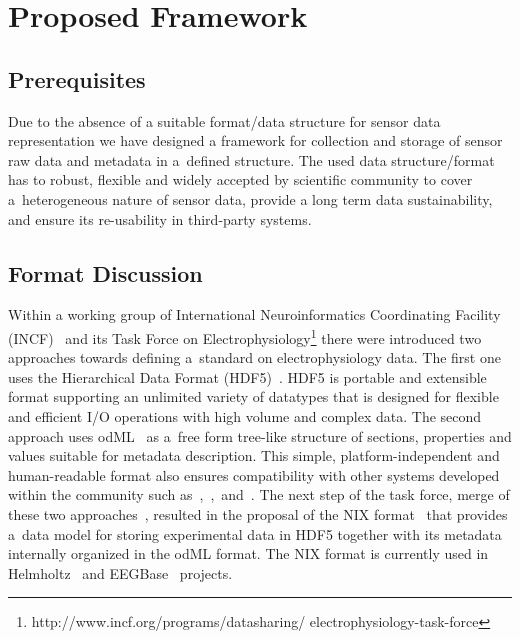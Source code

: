 \documentclass[conference]{IEEEtran}
\begin{document}
\section{Proposed Framework}\label{sec:framework}

\subsection{Prerequisites}\label{sec:requirements}

Due to the absence of a suitable format/data structure for sensor data representation we have designed a framework for collection and storage of sensor raw data and metadata in a~defined structure. The used data structure/format has to robust, flexible and widely accepted by scientific community to cover a~heterogeneous nature of sensor data, provide a long term data sustainability, and ensure its re-usability in third-party systems.

\subsection{Format Discussion}

Within a working group of International Neuroinformatics Coordinating Facility (INCF)~\cite{wvangeit:Bjaalie:JNeurosci:2007} and its Task Force on Electrophysiology\footnote{http://www.incf.org/programs/datasharing/ electrophysiology-task-force} there were introduced two approaches towards defining a~standard on electrophysiology data. The first one uses the Hierarchical Data Format (HDF5)~\cite{hdf5}. HDF5 is portable and extensible format supporting an unlimited variety of datatypes that is designed for flexible and efficient I/O operations with high volume and complex data. The second approach uses odML~\cite{10.3389/fninf.2011.00016} as a~free form tree-like structure of sections, properties and values suitable for metadata description. This simple, platform-independent and human-readable format also ensures compatibility with other systems developed within the community such as~\cite{10.3389/conf.fninf.2014.18.00029},~\cite{10.3389/conf.fninf.2014.18.00053},~and~\cite{10.3389/conf.fninf.2013.09.00025}. The next step of the task force, merge of these two approaches~\cite{10.3389/conf.fninf.2013.09.00069}, resulted in the proposal of the NIX format~\cite{Stoewer:2014} that provides a~data model for storing experimental data in HDF5 together with its metadata internally organized in the odML format. The NIX format is currently used in Helmholtz~\cite{10.3389/conf.fninf.2013.09.00025} and EEGBase~\cite{ISI:000306821100004} projects. 
\end{document}
